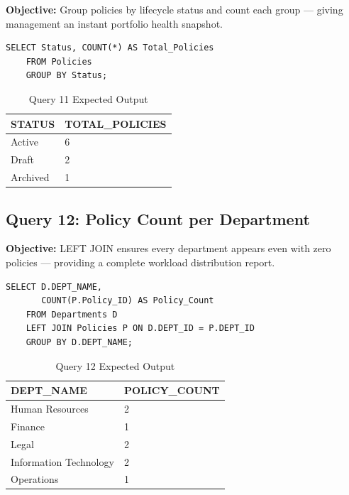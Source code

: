 \documentclass[conference]{IEEEtran}
\begin{document}
\textbf{Objective:} Group policies by lifecycle status and count each group — giving management an instant portfolio health snapshot.

\begin{lstlisting}[style=sqlstyle, caption={Query 11: Policy Count by Status (GROUP BY)}]
SELECT Status, COUNT(*) AS Total_Policies
    FROM Policies
    GROUP BY Status;
\end{lstlisting}

\begin{table}[H]
\centering
\caption{Query 11 Expected Output}
\begin{tabular}{|l|l|}
\hline
\textbf{STATUS} & \textbf{TOTAL\_POLICIES} \\
\hline
Active   & 6 \\
Draft    & 2 \\
Archived & 1 \\
\hline
\end{tabular}
\end{table}

\subsection{Query 12: Policy Count per Department}

\textbf{Objective:} LEFT JOIN ensures every department appears even with zero policies — providing a complete workload distribution report.

\begin{lstlisting}[style=sqlstyle, caption={Query 12: Count by Department (LEFT JOIN + GROUP BY)}]
SELECT D.DEPT_NAME,
       COUNT(P.Policy_ID) AS Policy_Count
    FROM Departments D
    LEFT JOIN Policies P ON D.DEPT_ID = P.DEPT_ID
    GROUP BY D.DEPT_NAME;
\end{lstlisting}

\begin{table}[H]
\centering
\caption{Query 12 Expected Output}
\begin{tabular}{|l|l|}
\hline
\textbf{DEPT\_NAME} & \textbf{POLICY\_COUNT} \\
\hline
Human Resources        & 2 \\
Finance                & 1 \\
Legal                  & 2 \\
Information Technology & 2 \\
Operations             & 1 \\
\hline
\end{tabular}
\end{table}
\end{document}
